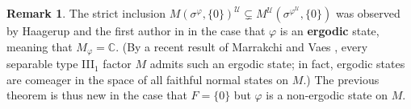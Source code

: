 \documentclass[12pt]{amsart}
\theoremstyle{definition}
\newtheorem{remark}[thm]{Remark}
\def\bb{\mathbb}
\def\bb{\mathbb}
\def\u{\mathsf 1}
\def \u{\mathcal U}
\begin{document}
\begin{remark}
The strict inclusion $M(\sigma^\varphi,\{0\})^\u\subsetneq M^\u(\sigma^{\varphi^\u},\{0\})$ was observed by Haagerup and the first author in \cite[Remark 4.28]{AH14} in the case that $\varphi$ is an \textbf{ergodic} state, meaning that $M_\varphi=\bb C$.  (By a recent result of Marrakchi and Vaes \cite{marrakchivaes2024ergodic}, every separable type III$_1$ factor $M$ admits such an ergodic state; in fact, ergodic states are comeager in the space of all faithful normal states on $M$.)  The previous theorem is thus new in the case that $F=\{0\}$ but $\varphi$ is a non-ergodic state on $M$.  
\end{remark}



\end{document}
